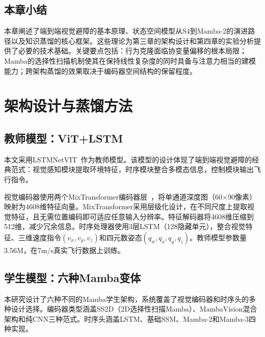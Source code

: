 \documentclass[12pt,a4paper]{article}
\makeatletter
\numberwithin{equation}{section}
\numberwithin{figure}{section}
\numberwithin{table}{section}
\newcommand{\cleardoublepage}{\clearpage\if@twoside\ifodd\c@page\else\hbox{}\thispagestyle{empty}\newpage\if@twocolumn\hbox{}\newpage\fi\fi\fi}%
\makeatother
\begin{document}
\subsection{本章小结}

本章阐述了端到端视觉避障的基本原理、状态空间模型从S4到Mamba-2的演进路径以及知识蒸馏的核心框架。这些理论为第三章的架构设计和第四章的实验分析提供了必要的技术基础。关键要点包括：行为克隆面临协变量偏移的根本局限；Mamba的选择性扫描机制使其在保持线性复杂度的同时具备与注意力相当的建模能力；跨架构蒸馏的效果取决于编码器空间结构的保留程度。

\cleardoublepage
\section{架构设计与蒸馏方法}

\subsection{教师模型：ViT+LSTM}

本文采用LSTMNetVIT~\cite{bhattacharya2024vitfly}作为教师模型。该模型的设计体现了端到端视觉避障的经典范式：视觉感知模块提取环境特征，时序模块整合多模态信息，控制模块输出飞行指令。

视觉编码器使用两个MixTransformer编码器层~\cite{xie2021segformer}，将单通道深度图（60$\times$90像素）映射为4608维特征向量。MixTransformer采用层级化设计，在不同尺度上提取视觉特征，且无需位置编码即可适应任意输入分辨率。特征解码器将4608维压缩到512维，减少冗余信息。时序处理器使用3层LSTM（128隐藏单元），整合视觉特征、三维速度指令$(v_x, v_y, v_z)$和四元数姿态$(q_w, q_x, q_y, q_z)$。教师模型参数量3.56M，在7m/s真实飞行数据上训练。

\subsection{学生模型：六种Mamba变体}

本研究设计了六种不同的Mamba学生架构，系统覆盖了视觉编码器和时序头的多种设计选择。编码器类型涵盖SS2D（2D选择性扫描Mamba）、MambaVision混合架构和纯CNN三种范式。时序头涵盖LSTM、基础SSM、Mamba-2和Mamba-3四种实现。
\end{document}
